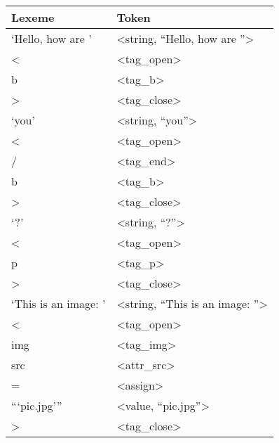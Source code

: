 \documentclass[10pt]{article}
\begin{document}
\begin{table}[H]
\centering
\begin{tabular}{p{6cm}l}
\bfseries  Lexeme                       &  \bfseries Token                                    \\
\hline
 `Hello, how are '             &  <string, ``Hello, how are ''>            \\
 <                            &  <tag\_open>                               \\
 b                            &  <tag\_b>                                  \\
 >                            &  <tag\_close>                              \\
 `you'                        &  <string, ``you''>                        \\
 <                            &  <tag\_open>                               \\
 /                            &  <tag\_end>                                \\
 b                            &  <tag\_b>                                  \\
 >                            &  <tag\_close>                              \\
 `?'                          &  <string, ``?''>                          \\
 <                            &  <tag\_open>                               \\
 p                            &  <tag\_p>                                  \\
 >                            &  <tag\_close>                              \\
 `This is an image: '         &  <string, ``This is an image: ''>         \\
 <                            &  <tag\_open>                               \\
 img                          &  <tag\_img>                                \\
 src                          &  <attr\_src>                               \\
 =                            &  <assign>                                 \\
 ```pic.jpg'''                  &  <value, ``pic.jpg''>                     \\
 >                            &  <tag\_close>                              \\

\end{tabular}
\end{table}
\end{document}
